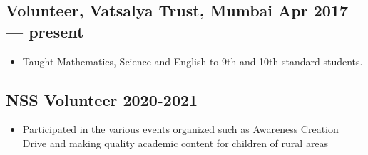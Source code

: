 \documentclass[10pt]{article}
\newenvironment{zitemize}{
\begin{itemize}\itemsep2pt \parskip0pt \parsep1pt}
{\end{itemize}\vspace{-0.5cm}}
\newcommand{\hskills}[1]{
\textbf{\bfseries #1} }
\begin{document}
\subsection*{Volunteer, Vatsalya Trust, Mumbai \hfill Apr 2017 --- present} 
    \begin{zitemize}
            \item  Taught Mathematics, Science and English to 9th and 10th standard students.
    \end{zitemize}


\subsection*{NSS Volunteer \hfill 2020-2021} 
    \begin{zitemize}
            \item Participated in the various events organized such as Awareness Creation Drive and making quality academic content for children of rural areas
    \end{zitemize}







\end{document}
